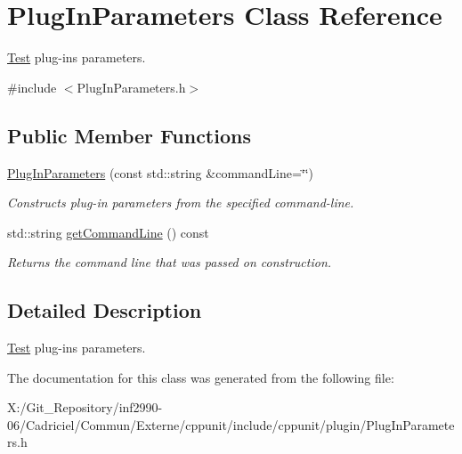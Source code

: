 \hypertarget{class_plug_in_parameters}{\section{Plug\-In\-Parameters Class Reference}
\label{class_plug_in_parameters}
}


\hyperlink{class_test}{Test} plug-\/ins parameters.  




{\ttfamily \#include $<$Plug\-In\-Parameters.\-h$>$}

\subsection*{Public Member Functions}
\begin{DoxyCompactItemize}
\item 
\hypertarget{class_plug_in_parameters_acbf183c92faaa4e17dc66dec87ddc033}{\hyperlink{class_plug_in_parameters_acbf183c92faaa4e17dc66dec87ddc033}{Plug\-In\-Parameters} (const std\-::string \&command\-Line=\char`\"{}\char`\"{})}\label{class_plug_in_parameters_acbf183c92faaa4e17dc66dec87ddc033}

\begin{DoxyCompactList}\small\item\em Constructs plug-\/in parameters from the specified command-\/line. \end{DoxyCompactList}\item 
\hypertarget{class_plug_in_parameters_aad9dfbb3f1745b72154ab6b70948d629}{std\-::string \hyperlink{class_plug_in_parameters_aad9dfbb3f1745b72154ab6b70948d629}{get\-Command\-Line} () const }\label{class_plug_in_parameters_aad9dfbb3f1745b72154ab6b70948d629}

\begin{DoxyCompactList}\small\item\em Returns the command line that was passed on construction. \end{DoxyCompactList}\end{DoxyCompactItemize}


\subsection{Detailed Description}
\hyperlink{class_test}{Test} plug-\/ins parameters. 

The documentation for this class was generated from the following file\-:\begin{DoxyCompactItemize}
\item 
X\-:/\-Git\-\_\-\-Repository/inf2990-\/06/\-Cadriciel/\-Commun/\-Externe/cppunit/include/cppunit/plugin/Plug\-In\-Parameters.\-h\end{DoxyCompactItemize}
